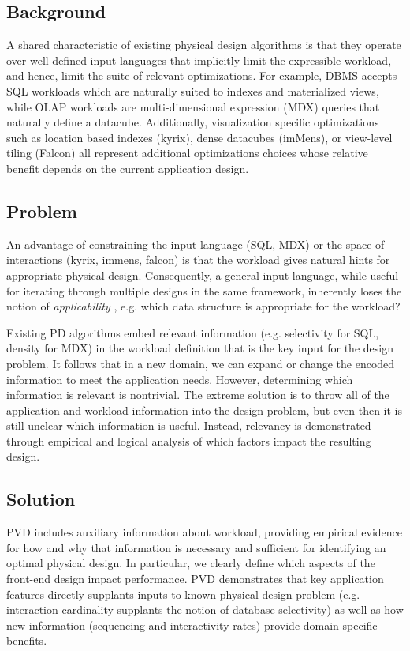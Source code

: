 \subsection{Background} A shared characteristic of existing physical design algorithms is that they operate over well-defined input languages that implicitly limit the expressible workload, and hence, limit the suite of relevant optimizations. For example, DBMS accepts SQL workloads which are naturally suited to indexes and materialized views, while OLAP workloads are multi-dimensional expression (MDX) queries that naturally define a datacube. Additionally, visualization specific optimizations such as location based indexes (kyrix), dense datacubes (imMens), or view-level tiling (Falcon) all represent additional optimizations choices whose relative benefit depends on the current application design.

\subsection{Problem}
An advantage of constraining the input language (SQL, MDX) or the space of interactions (kyrix, immens, falcon) is that the workload gives natural hints for appropriate physical design. Consequently, a general input language, while useful for iterating through multiple designs in the same framework, inherently loses the notion of \textit{applicability} , e.g. which data structure is appropriate for the workload? 

Existing PD algorithms embed relevant information (e.g. selectivity for SQL, density for MDX) in the workload definition that is the key input for the design problem. It follows that in a new domain, we can expand or change the encoded information to meet the application needs. However, determining which information is relevant is nontrivial. The extreme solution is to throw all of the application and workload information into the design problem, but even then it is still unclear which information is useful. Instead, relevancy is demonstrated through empirical and logical analysis of which factors impact the resulting design. 

\subsection{Solution} PVD includes auxiliary information about workload, providing empirical evidence for how and why that information is necessary and sufficient for identifying an optimal physical design. In particular, we clearly define which aspects of the front-end design impact performance. PVD demonstrates that key application features directly supplants inputs to known physical design problem (e.g. interaction cardinality supplants the notion of database selectivity) as well as how new information (sequencing and interactivity rates) provide domain specific benefits. 

